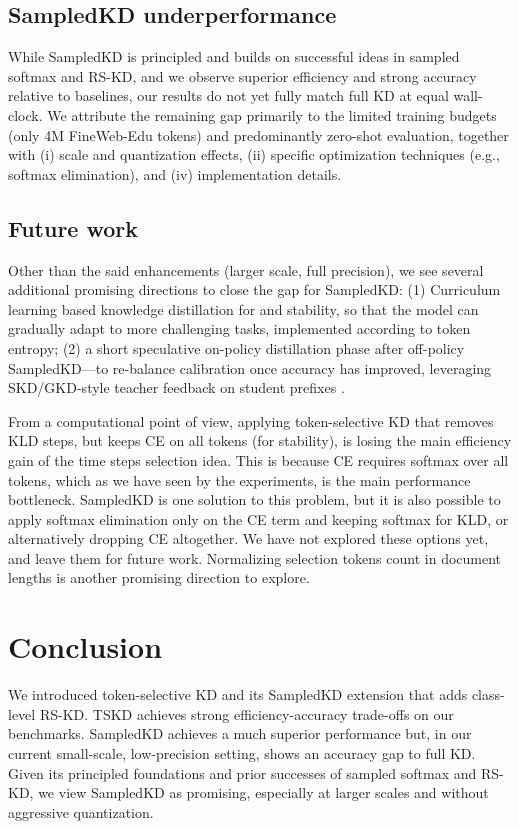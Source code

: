 \documentclass[11pt]{article}
\begin{document}
\subsection{SampledKD underperformance}
While SampledKD is principled and builds on successful ideas in sampled softmax and RS-KD, and we observe superior efficiency and strong accuracy relative to baselines, our results do not yet fully match full KD at equal wall-clock.
We attribute the remaining gap primarily to the limited training budgets (only 4M FineWeb-Edu tokens) and predominantly zero-shot evaluation, together with (i) scale and quantization effects, (ii) specific optimization techniques  (e.g., softmax elimination), and (iv) implementation details.

\subsection{Future work}
Other than the said enhancements (larger scale, full precision), we see several additional promising directions to close the gap for SampledKD: 
(1) Curriculum learning based knowledge distillation for and stability, so that the model can gradually adapt to more challenging tasks, implemented according to token entropy; (2) a short speculative on-policy distillation phase after off-policy SampledKD---to re-balance calibration once accuracy has improved, leveraging SKD/GKD-style teacher feedback on student prefixes \citep{xu2024speculative}.

From a computational point of view, applying token-selective KD that removes KLD steps, but keeps CE on all tokens (for stability), is losing the main efficiency gain of the time steps selection idea.
This is because CE requires softmax over all tokens, which as we have seen by the experiments, is the main performance bottleneck.
SampledKD is one solution to this problem, but it is also possible to apply softmax elimination only on the CE term and keeping softmax for KLD, or alternatively dropping CE altogether.
We have not explored these options yet, and leave them for future work.
Normalizing selection tokens count in document lengths is another promising direction to explore.

\section{Conclusion}
\label{sec:conclusion}
We introduced token-selective KD and its SampledKD extension that adds class-level RS-KD.
TSKD achieves strong efficiency-accuracy trade-offs on our benchmarks.
SampledKD achieves a much superior performance but, in our current small-scale, low-precision setting, shows an accuracy gap to full KD.
Given its principled foundations and prior successes of sampled softmax and RS-KD, we view SampledKD as promising, especially at larger scales and without aggressive quantization.
\end{document}
